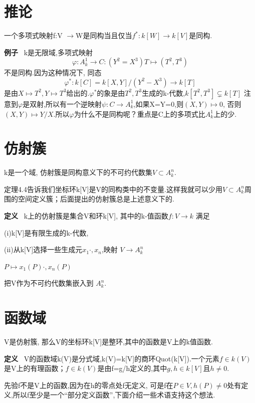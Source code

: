\documentclass[UTF8]{book}
\begin{document}
	\section{推论}一个多项式映射f:V $\rightarrow $W是同构当且仅当$f^{*}:k[W]\rightarrow k[V]$是同构.

		\textbf{例子} \ k是无限域,多项式映射
		\begin{equation*}
		\varphi:A^{1}_{k}\rightarrow C:(Y^{2}=X^{3})  T\mapsto (T^{2},T^{3})
		\end{equation*}
		不是同构.因为这种情况下, 同态
		\begin{equation*}
		\varphi^{*}:k[C]=k[X,Y]/(Y^{2}-X^{3})\rightarrow k[T]
		\end{equation*}
		是由$X\mapsto T^{2},Y\mapsto T^{3}$给出的.$\varphi^{*}$的象是由$T^{2},T^{3}$生成的k-代数,$k[T^{2},T^{3}]\subsetneq k[T]$
		注意到$\varphi$是双射,所以有一个逆映射$\psi :C\rightarrow A^{1}_{k}$,如果X=Y=0,则$(X,Y)\mapsto 0$, 否则$(X,Y)\mapsto Y/X$.所以$\varphi$为什么不是同构呢？重点是C上的多项式比$A^{1}_{k}$上的少.
	\section{仿射簇}
		k是一个域, 仿射簇是同构意义下的不可约代数集$V\subset A^{n}_{k}$.

		定理4.4告诉我们坐标环k[V]是V的同构类中的不变量.这样我就可以少用$V\subset A^{n}_{k}$周围的空间定义簇；后面提出的仿射簇总是上述意义下的.

		\textbf{定义} \ k上的仿射簇是集合V和环k[V], 其中的k-值函数$f:V\rightarrow k$ 满足

		(i)k[V]是有限生成的k-代数,

		(ii)从k[V]选择一些生成元$x_{1}  \cdot, x_{n}$,映射
		\center $ V \rightarrow  A^{n}_{k}$


		$P\mapsto x_{1}(P)  \cdot, x_{n}(P)$

		\justifying
		把V作为不可约代数集嵌入到 $A^{n}_{k}$.
		\section{函数域}V是仿射簇, 那么V的坐标环k[V]是整环,其中的函数是V上的k值函数.

		\textbf{定义} \ V的函数域k(V)是分式域,k(V)=k[V]的商环Quot(k[V]).一个元素$f\in k(V)$是V上的有理函数；$f\in k(V)$是由f=g/h定义的,其中$g,h\in k[V]$且$h\neq 0$.

		先验f不是V上的函数,因为在h的零点处f无定义, 可是f在$P\in V,h(P)\neq 0$处有定义,所以f至少是一个“部分定义函数”,下面介绍一些术语支持这个想法.
\end{document}
